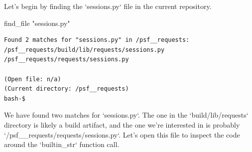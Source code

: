 {\begin{agentbox}
Let's begin by finding the `sessions.py` file in the current repository.

\hrulefill
\begin{CodeVerbatim}[breaklines=true, breakanywhere=true]
find_file "sessions.py"
\end{CodeVerbatim}
\end{agentbox}
\begin{observationbox}\begin{Verbatim}[breaklines=true, breakanywhere=true]
Found 2 matches for "sessions.py" in /psf__requests:
/psf__requests/build/lib/requests/sessions.py
/psf__requests/requests/sessions.py

(Open file: n/a)
(Current directory: /psf__requests)
bash-$
\end{Verbatim}
\end{observationbox}
\begin{agentbox}
We have found two matches for `sessions.py`. The one in the `build/lib/requests` directory is likely a build artifact, and the one we're interested in is probably `/psf\_\_requests/requests/sessions.py`. Let's open this file to inspect the code around the `builtin\_str` function call.




\end{agentbox}}
